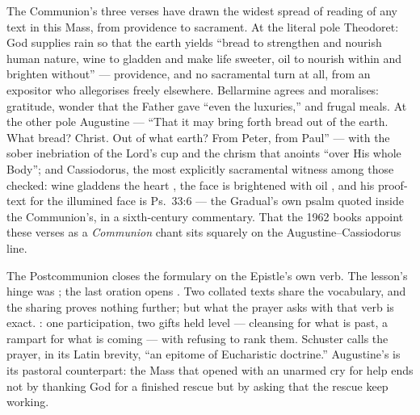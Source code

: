 The Communion's three verses have drawn the widest spread of reading of any
text in this Mass, from providence to sacrament. At the literal pole
Theodoret: God supplies rain so that the earth yields ``bread to strengthen
and nourish human nature, wine to gladden and make life sweeter, oil to
nourish within and brighten without'' --- providence, and no sacramental turn
at all, from an expositor who allegorises freely elsewhere. Bellarmine agrees
and moralises: gratitude, wonder that the Father gave ``even the luxuries,''
and frugal meals. At the other pole Augustine --- ``That it may bring forth
bread out of the earth. What bread? Christ. Out of what earth? From Peter,
from Paul'' --- with the sober inebriation of the Lord's cup and the chrism
that anoints ``over His whole Body''; and Cassiodorus, the most explicitly
sacramental witness among those checked: wine gladdens the heart , the face is brightened with oil
, and his proof-text for the illumined
face is Ps.~33:6 --- the Gradual's own psalm quoted inside the Communion's, in
a sixth-century commentary. That the 1962 books appoint these verses as a
\textit{Communion} chant sits squarely on the Augustine--Cassiodorus line.

The Postcommunion closes the formulary on the Epistle's own verb. The lesson's
hinge was ; the last oration opens
. Two collated texts share the vocabulary, and the
sharing proves nothing further; but what the prayer asks with that verb is
exact. : one
participation, two gifts held level --- cleansing for what is past, a rampart
for what is coming --- with  refusing to rank them. Schuster
calls the prayer, in its Latin brevity, ``an epitome of Eucharistic
doctrine.'' Augustine's  is its pastoral counterpart: the
Mass that opened with an unarmed cry for help ends not by thanking God for a
finished rescue but by asking that the rescue keep working.
